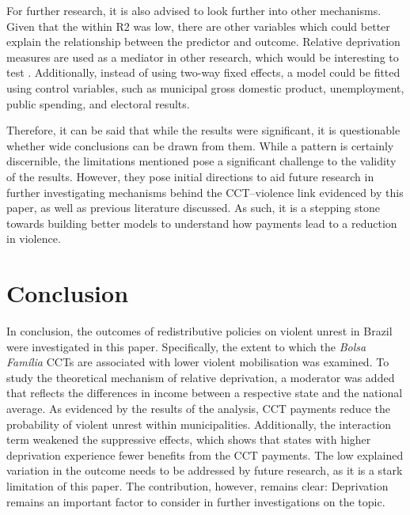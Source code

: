 \documentclass[stu,12pt]{apa7}
\begin{document}
For further research, it is also advised to look further into other mechanisms. Given that the within R2 was low, there are other variables which could better explain the relationship between the predictor and outcome. Relative deprivation measures are used as a mediator in other research, which would be interesting to test \parencite{jiangRelativeDeprivationMechanism2020}. Additionally, instead of using two-way fixed effects, a model could be fitted using control variables, such as municipal gross domestic product, unemployment, public spending, and electoral results.

Therefore, it can be said that while the results were significant, it is questionable whether wide conclusions can be drawn from them. While a pattern is certainly discernible, the limitations mentioned pose a significant challenge to the validity of the results. However, they pose initial directions to aid future research in further investigating mechanisms behind the CCT–violence link evidenced by this paper, as well as previous literature discussed. As such, it is a stepping stone towards building better models to understand how payments lead to a reduction in violence.

\section{Conclusion}

In conclusion, the outcomes of redistributive policies on violent unrest in Brazil were investigated in this paper. Specifically, the extent to which the \textit{Bolsa Família} CCTs are associated with lower violent mobilisation was examined. To study the theoretical mechanism of relative deprivation, a moderator was added that reflects the differences in income between a respective state and the national average. As evidenced by the results of the analysis, CCT payments reduce the probability of violent unrest within municipalities. Additionally, the interaction term weakened the suppressive effects, which shows that states with higher deprivation experience fewer benefits from the CCT payments. The low explained variation in the outcome needs to be addressed by future research, as it is a stark limitation of this paper. The contribution, however, remains clear: Deprivation remains an important factor to consider in further investigations on the topic.

\printbibliography
\end{document}
